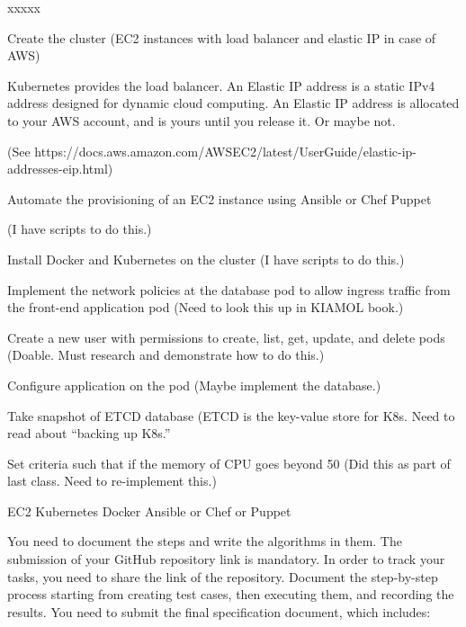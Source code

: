 xxxxx


\ms

\myiteminit

\myitem Create the cluster (EC2 instances with load balancer and elastic IP in case of AWS)

Kubernetes provides the load balancer. An Elastic IP address is a static IPv4 address designed
for dynamic cloud computing. An Elastic IP address is allocated to your AWS account, and is yours until you release it.
Or maybe not.  

\noindent (See https://docs.aws.amazon.com/AWSEC2/latest/UserGuide/elastic-ip-addresses-eip.html)


\ms
\myitem Automate the provisioning of an EC2 instance using Ansible or Chef Puppet

(I have scripts to do this.)
\ms

\myitem Install Docker and Kubernetes on the cluster
(I have scripts to do this.)
\ms

\myitem Implement the network policies at the database pod to allow ingress traffic from the front-end application pod
(Need to look this up in KIAMOL book.)
\ms

\myitem Create a new user with permissions to create, list, get, update, and delete pods
(Doable.  Must research and demonstrate how to do this.)
\ms

\myitem Configure application on the pod
(Maybe implement the database.)
\ms

\myitem Take snapshot of ETCD database
(ETCD is the key-value store for K8s.  Need to read about ``backing up K8s.''
\ms

\myitem Set criteria such that if the memory of CPU goes beyond 50%
(Did this as part of last class.  Need to re-implement this.)

\bs


\ms

\myiteminit

\myitem EC2
\myitem    Kubernetes
\myitem    Docker
\myitem     Ansible or Chef or Puppet

\bs


\ms

\myiteminit

\myitem    You need to document the steps and write the algorithms in them.
\myitem    The submission of your GitHub repository link is mandatory. In order to track your tasks, you need to share the link of the repository.
\myitem Document the step-by-step process starting from creating test cases, then executing them, and recording the results.
\myitem     You need to submit the final specification document, which includes:


